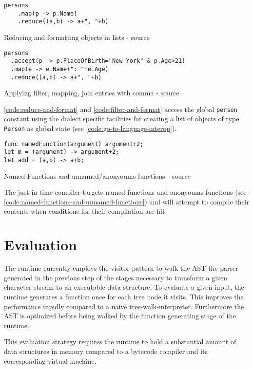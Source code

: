 \begin{listing}[H]
    \begin{verbatim}
persons
    .map(p -> p.Name)
    .reduce((a,b) -> a+", "+b)
    \end{verbatim}
    \caption{Reducing and formatting objects in lists - source \cite{parser2_xnacly}}
    \label{code:reduce-and-format}
\end{listing}

\begin{listing}[H]
    \begin{verbatim}
persons
  .accept(p -> p.PlaceOfBirth="New York" & p.Age>21)
  .map(e -> e.Name+": "+e.Age)
  .reduce((a,b) -> a+", "+b)
    \end{verbatim}
    \caption{Applying filter, mapping, join entries with comma - source \cite{parser2_xnacly}}
    \label{code:filter-and-format}
\end{listing}


\autoref{code:reduce-and-format} and \autoref{code:filter-and-format} access
the global \texttt{person} constant using the dialect specific facilities for
creating a list of objects of type \texttt{Person} as global state (see
\autoref{code:go-to-language-interop}).

\begin{listing}[H]
    \begin{verbatim}
func namedFunction(argument) argument+2;
let m = (argument) -> argument+2;
let add = (a,b) -> a+b;
    \end{verbatim}
    \caption{Named Functions and unnamed/anonyoums functions - source \cite{parser2_xnacly}}
    \label{code:named-functions-and-unnamed-functions}
\end{listing}


The just in time compiler targets named functions and anonyoums functions (see
\autoref{code:named-functions-and-unnamed-functions}) and will attempt to
compile their contents when conditions for their compilation are hit.


\section{Evaluation}

The runtime currently employs the visitor pattern to walk the AST the parser
generated in the previous step of the stages necessary to transform a given
character stream to an executable data structure. To evaluate a given input,
the runtime generates a function once for each tree node it visits. This
improves the performance rapidly compared to a naive tree-walk-interpreter.
Furthermore the AST is optimized before being walked by the function generating
stage of the runtime. 

This evaluation strategy requires the runtime to hold a substantial amount of
data structures in memory compared to a bytecode compiler and its corresponding
virtual machine.

